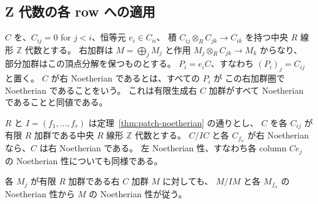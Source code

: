 \subsection{Z 代数の各 row への適用}

\begin{definition}
$C$ を、$C_{ij}=0$ for $j<i$、恒等元 $e_i\in C_{ii}$、
積 $C_{ij}\otimes_R C_{jk}\to C_{ik}$ を持つ中央 $R$ 線形 $\mathbb Z$ 代数とする。
右加群は $M=\bigoplus_jM_j$ と作用 $M_j\otimes_R C_{jk}\to M_k$ からなり、
部分加群はこの頂点分解を保つものとする。
$P_i=e_iC$、すなわち $(P_i)_j=C_{ij}$ と置く。
$C$ が右 Noetherian であるとは、すべての $P_i$ が
この右加群圏で Noetherian であることをいう。
これは有限生成右 $C$ 加群がすべて Noetherian であることと同値である。
\end{definition}

\begin{theorem}
\label{thm:patch-z-algebra}
$R$ と $I=(f_1,\ldots,f_r)$ は定理~\ref{thm:patch-noetherian} の通りとし、
$C$ を各 $C_{ij}$ が有限 $R$ 加群である中央 $R$ 線形 $\mathbb Z$ 代数とする。
$C/IC$ と各 $C_{f_\alpha}$ が右 Noetherian なら、$C$ は右 Noetherian である。
左 Noetherian 性、すなわち各 column $Ce_j$ の Noetherian 性についても同様である。

各 $M_j$ が有限 $R$ 加群である右 $C$ 加群 $M$ に対しても、
$M/IM$ と各 $M_{f_\alpha}$ の Noetherian 性から $M$ の Noetherian 性が従う。
\end{theorem}

